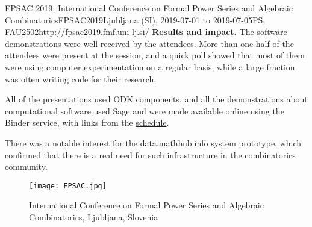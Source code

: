 \begin{event}{FPSAC 2019: International Conference on Formal Power Series and Algebraic Combinatorics}{FPSAC2019}{Ljubljana (SI),
  2019-07-01 to
  2019-07-05}{PS, FAU}{250}{2}{http://fpsac2019.fmf.uni-lj.si/}
\textbf{Results and impact.} The software demonstrations were well
received by the attendees. More than one half of the attendees were
present at the session, and a quick poll showed that most of them were
using computer experimentation on a regular basis, while a large
fraction was often writing code for their research.

All of the presentations used ODK components, and all the
demonstrations about computational software used Sage and were made
available online using the Binder service, with links from the
\href{http://fpsac2019.fmf.uni-lj.si/schedule/}{schedule}.

There was a notable interest for the \textsf{data.math\-hub.info}
system prototype, which confirmed that there is a real need for such
infrastructure in the combinatorics community.

\begin{figure}[ht]
  \texttt{[image: FPSAC.jpg]}
  \caption*{International Conference on Formal Power Series and Algebraic Combinatorics, Ljubljana, Slovenia}
\end{figure}

\end{event}
